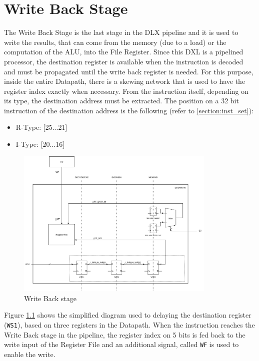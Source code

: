 
\chapter{Write Back Stage}
The Write Back Stage is the last stage in the DLX pipeline and it is used to write the results, that can come from the memory (due to a load) or the computation of the ALU, into the File Register.
Since this DXL is a pipelined processor, the destination register is available when the instruction is decoded and must be propagated until the write back register is needed. For this purpose, inside the entire Datapath, there is a skewing network that is used to have the register index exactly when necessary. \newline\newline
From the instruction itself, depending on its type, the destination address must be extracted. The position on a 32 bit instruction of the destination address is the following (refer to \ref{section:inst_set}):
\begin{itemize}
    \itemsep0sp
    \item R-Type: [25...21]
    \item I-Type: [20...16]
\end{itemize}
\begin{figure}[H]   
    \centering
    \includegraphics[width=0.85\textwidth]{chapters/7_WriteBackStage/images/writeback.pdf}
    \caption{Write Back stage}
    \label{fig:wb_stage}
\end{figure}
Figure \ref{fig:wb_stage} shows the simplified diagram used to delaying the destination register (\texttt{WS1}), based on three registers in the Datapath.
When the instruction reaches the Write Back stage in the pipeline, the register index on 5 bits is fed back to the write input of the Register File and an additional signal, called \texttt{WF} is used to enable the write.\newline\newline
